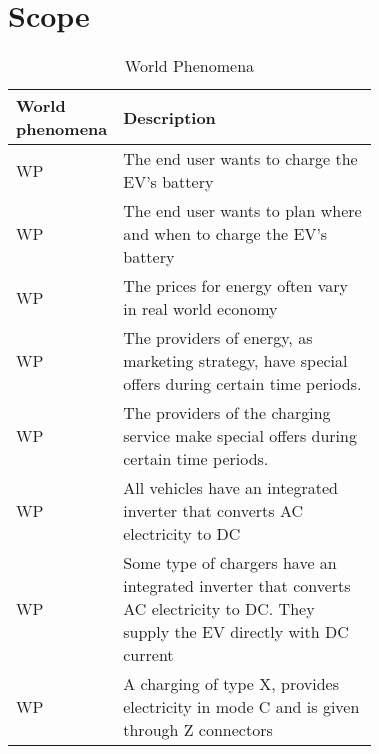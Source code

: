 \section{Scope}
\label{sec:Scope}%
\setcounter{wp}{1}
\newcommand{\wpcount}{\thewp\stepcounter{wp}}
\begin{table}[H]
    \centering
    \begin{tabular}{|l|p{0.725\linewidth}|}
     \hline
     \textbf{World phenomena} & \textbf{Description} \\
     \hline
     WP\wpcount & The end user wants to charge the EV's battery \\
     \hline
     WP\wpcount & The end user wants to plan where and when to charge the EV's battery \\
     \hline
     WP\wpcount & The prices for energy often vary in real world economy \\ 
     \hline
     WP\wpcount & The providers of energy, as marketing strategy, have special offers during certain time periods.\\
     \hline
     WP\wpcount & The providers of the charging service make special offers during certain time periods.\\
     \hline
     WP\wpcount & All vehicles have an integrated inverter that converts AC electricity to DC \\
     \hline
     WP\wpcount & Some type of chargers have an integrated inverter that converts AC electricity to DC. They supply the EV directly with DC current \\
     \hline
     WP\wpcount & A charging of type X, provides electricity in mode C and is given through Z connectors \\
     \hline
\end{tabular}
    \caption{World Phenomena}
    \label{tab:World Phenomena}
\end{table}


